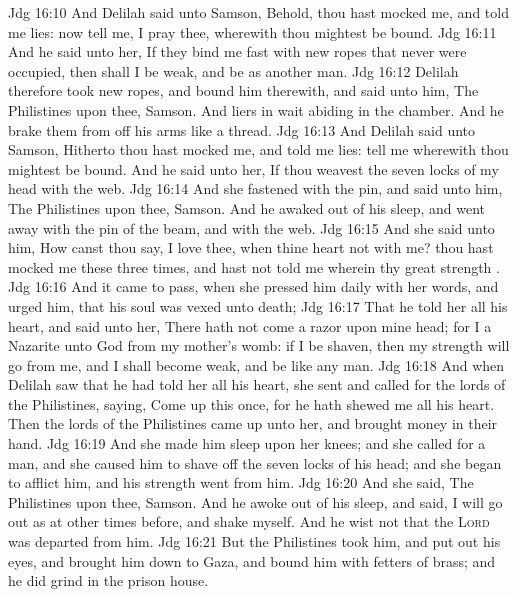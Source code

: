 \vs Jdg 16:10 And Delilah said unto Samson, Behold, thou hast mocked me, and told me lies: now tell me, I pray thee, wherewith thou mightest be bound.
\vs Jdg 16:11 And he said unto her, If they bind me fast with new ropes that never were occupied, then shall I be weak, and be as another man.
\vs Jdg 16:12 Delilah therefore took new ropes, and bound him therewith, and said unto him, The Philistines  upon thee, Samson. And  liers in wait abiding in the chamber. And he brake them from off his arms like a thread.
\vs Jdg 16:13 And Delilah said unto Samson, Hitherto thou hast mocked me, and told me lies: tell me wherewith thou mightest be bound. And he said unto her, If thou weavest the seven locks of my head with the web.
\vs Jdg 16:14 And she fastened  with the pin, and said unto him, The Philistines  upon thee, Samson. And he awaked out of his sleep, and went away with the pin of the beam, and with the web.
\vs Jdg 16:15 And she said unto him, How canst thou say, I love thee, when thine heart  not with me? thou hast mocked me these three times, and hast not told me wherein thy great strength .
\vs Jdg 16:16 And it came to pass, when she pressed him daily with her words, and urged him,  that his soul was vexed unto death;
\vs Jdg 16:17 That he told her all his heart, and said unto her, There hath not come a razor upon mine head; for I  a Nazarite unto God from my mother's womb: if I be shaven, then my strength will go from me, and I shall become weak, and be like any  man.
\vs Jdg 16:18 And when Delilah saw that he had told her all his heart, she sent and called for the lords of the Philistines, saying, Come up this once, for he hath shewed me all his heart. Then the lords of the Philistines came up unto her, and brought money in their hand.
\vs Jdg 16:19 And she made him sleep upon her knees; and she called for a man, and she caused him to shave off the seven locks of his head; and she began to afflict him, and his strength went from him.
\vs Jdg 16:20 And she said, The Philistines  upon thee, Samson. And he awoke out of his sleep, and said, I will go out as at other times before, and shake myself. And he wist not that the \textsc{Lord} was departed from him.
\vs Jdg 16:21 But the Philistines took him, and put out his eyes, and brought him down to Gaza, and bound him with fetters of brass; and he did grind in the prison house.
